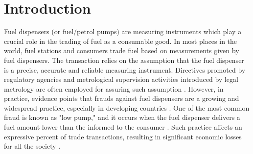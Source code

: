 \documentclass[sigplan]{acmart}
\begin{document}
%
%




\maketitle

\section{Introduction}
Fuel dispensers (or fuel/petrol pumps) are measuring instruments which play a crucial role in the trading of fuel as a consumable good.
In most places in the world, fuel stations and consumers trade fuel based on measurements given by fuel dispensers.
The transaction relies on the assumption that the fuel dispenser is a precise, accurate and reliable measuring instrument.
Directives promoted by regulatory agencies and metrological supervision activities introduced by legal metrology are often employed for assuring such assumption \cite{RodriguesFilho2015}.
However, in practice, evidence points that frauds against fuel dispensers are a growing and widespread practice, especially in developing countries \cite{Luchsinger2008,Leitao2014a,Beteto2016,RodriguesFilho2016}.
One of the most common fraud is known as "low pump," and it occurs when the fuel dispenser delivers a fuel amount lower than the informed to the consumer \cite{Beteto2016}.
Such practice affects an expressive percent of trade transactions, resulting in significant economic losses for all the society \cite{RodriguesFilho2016}.
\end{document}
